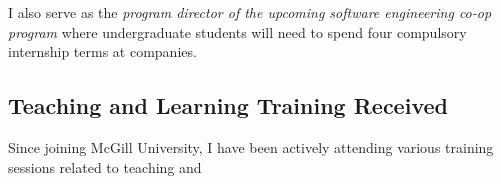 \documentclass[a4paper,11pt]{report}
\begin{document}
I also serve as the \emph{program director of the upcoming software engineering co-op program } where undergraduate students will need to spend four compulsory internship terms at companies.

\subsection{Teaching and Learning Training Received}
Since joining McGill University, I have been actively attending various training sessions related to teaching and 

%
%




%
\end{document}
